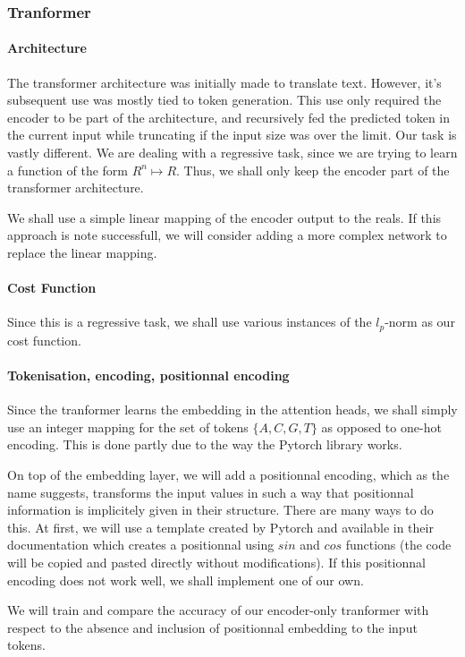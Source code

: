 \documentclass{article}
\begin{document}
\subsubsection{Tranformer}
\paragraph{Architecture}
The transformer architecture was initially made to translate text.
However, it's subsequent use was mostly tied to token generation. 
This use only required the encoder to be part of the architecture, 
and recursively fed the predicted token in the current input while 
truncating if the input size was over the limit.
Our task is vastly different. We are dealing with a regressive task,
since we are trying to learn a function of the form $R^n \mapsto R$.
Thus, we shall only keep the encoder part of the transformer architecture. 

We shall use a simple linear mapping of the encoder output to the reals.
If this approach is note successfull, we will consider adding a more complex
network to replace the linear mapping.
\paragraph{Cost Function}
Since this is a regressive task, we shall use various instances of the 
$l_p$-norm as our cost function.

\paragraph{Tokenisation, encoding, positionnal encoding}
Since the tranformer learns the embedding in the attention heads\cite{transformers}, 
we shall simply use an integer mapping for the set of tokens $\{A,C,G,T\}$ as opposed to 
one-hot encoding. This is done partly due to the way the Pytorch library works.

On top of the embedding layer, we will add a positionnal encoding, which as the
name suggests, transforms the input values in such a way that positionnal information 
is implicitely given in their structure. There are many ways to do this. At first, we will use 
a template created by Pytorch and available in their documentation which creates
a positionnal using $sin$ and $cos$ functions (the code will be copied and 
pasted directly without modifications). If this positionnal encoding does not
work well, we shall implement one of our own.

We will train and compare the accuracy of our encoder-only tranformer with 
respect to the absence and inclusion of positionnal embedding to the input tokens.
\end{document}
